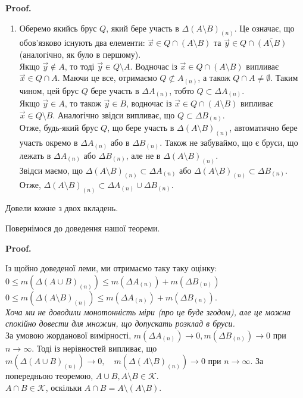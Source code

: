 \documentclass[a4paper, 10pt]{article}
\makeatletter
\def\qed{$\blacksquare$}
\theoremstyle{theoremdd}
\theoremstyle{theoremdd}
\theoremstyle{theoremdd}
\theoremstyle{theoremdd}
\theoremstyle{theoremdd}
\theoremstyle{theoremdd}
\theoremstyle{theoremdd}
\theoremstyle{theoremdd}
\theoremstyle{theoremdd}
\theoremstyle{theoremdd}
\theoremstyle{theoremdd}
\theoremstyle{theoremdd}
\theoremstyle{theoremdd}
\theoremstyle{theoremdd}
\theoremstyle{theoremdd}
\renewenvironment{proof}[1][Proof.\\]{\par
\pushQED{\hfill \qed}%
\normalfont \topsep6\p@\@plus6\p@\relax
\trivlist
\item\relax
{\bfseries
#1\@addpunct{.}}\hspace\labelsep\ignorespaces
}{%
\popQED\endtrivlist\@endpefalse
}
\makeatother
\begin{document}
\begin{proof}
\begin{enumerate}[wide=0pt,label={\arabic*)}]
\item Оберемо якийсь брус $Q$, який бере участь в $\Delta (A \setminus B)_{(n)}$. Це означає, що обов'язково існують два елементи: $\vec{x} \in Q \cap (A \setminus B)$ та $\vec{y} \in Q \cap \overline{(A \setminus B)}$ (аналогічно, як було в першому).\\
Якщо $\vec{y} \not\in A$, то тоді $\vec{y} \in Q \setminus A$. Водночас із $\vec{x} \in Q \cap (A \setminus B)$ випливає $\vec{x} \in Q \cap A$. Маючи це все, отримаємо $Q \not\subset A_{(n)}$, а також $Q \cap A \neq \emptyset$. Таким чином, цей брус $Q$ бере участь в $\Delta A_{(n)}$, тобто $Q \subset \Delta A_{(n)}$.\\
Якщо $\vec{y} \in A$, то також $\vec{y} \in B$, водночас із $\vec{x} \in Q \cap (A \setminus B)$ випливає $\vec{x} \in Q \setminus B$. Аналогічно звідси випливає, що $Q \subset \Delta B_{(n)}$.\\
Отже, будь-який брус $Q$, що бере участь в $\Delta (A \setminus B)_{(n)}$, автоматично бере участь окремо в $\Delta A_{(n)}$ або в $\Delta B_{(n)}$. Також не забуваймо, що є бруси, що лежать в $\Delta A_{(n)}$ або $\Delta B_{(n)}$, але не в $\Delta (A \setminus B)_{(n)}$.\\
Звідси маємо, що $\Delta (A \setminus B)_{(n)} \subset \Delta A_{(n)}$ або $\Delta (A \setminus B)_{(n)} \subset \Delta B_{(n)}$. Отже, $\Delta (A \setminus B)_{(n)} \subset \Delta A_{(n)} \cup \Delta B_{(n)}$.
\end{enumerate}
Довели кожне з двох вкладень.
\end{proof}

Повернімося до доведення нашої теореми.

\begin{proof}
Із щойно доведеної леми, ми отримаємо таку таку оцінку:\\
$0 \leq m(\Delta (A \cup B)_{(n)}) \leq m(\Delta A_{(n)}) + m(\Delta B_{(n)})$\\
$0 \leq m(\Delta (A \setminus B)_{(n)}) \leq m(\Delta A_{(n)}) + m(\Delta B_{(n)})$.\\
\textit{Хоча ми не доводили монотонність міри (про це буде згодом), але це можна спокійно довести для множин, що допускать розклад в бруси.}\\
За умовою жорданової вимірності, $m(\Delta A_{(n)}) \to 0, m(\Delta B_{(n)}) \to 0$ при $n \to \infty$. Тоді із нерівностей випливає, що $m(\Delta (A \cup B)_{(n)}) \to 0, \quad m(\Delta (A \setminus B)_{(n)}) \to 0$ при $n \to \infty$. За попередньою теоремою, $A \cup B, A \setminus B \in \mathcal{K}$.\\
$A \cap B \in \mathcal{K}$, оскільки $A \cap B = A \setminus (A \setminus B)$.
\end{proof}
\end{document}
